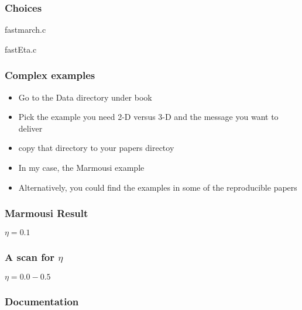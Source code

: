 \begin{frame} \frametitle{Choices}

\normalsize 

		{fastmarch.c}

		{fastEta.c}
		
\end{frame}
\cwpnote{}

\begin{frame} \frametitle{Complex examples}

\begin{itemize}
   \item Go to the Data directory under book
   \item Pick the example you need 2-D versus 3-D and the message you want to deliver
   \item copy that directory to your papers directoy
   \item In my case, the Marmousi example
   \item Alternatively, you could find the examples in some of the reproducible papers
\end{itemize}

\end{frame}
\cwpnote{}

\begin{frame} \frametitle{Marmousi Result}

\vspace{1in}
$\eta=0.1$
 \end{frame}
\cwpnote{}

\begin{frame} \frametitle{A scan for $\eta$}


$\eta=0.0-0.5$
 \end{frame}
\cwpnote{}



\begin{frame} \frametitle{Documentation}


\end{frame}
\cwpnote{}

